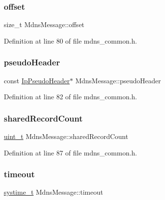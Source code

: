 \subsubsection{\texorpdfstring{offset}{offset}}
{\footnotesize\ttfamily size\+\_\+t Mdns\+Message\+::offset}



Definition at line 80 of file mdns\+\_\+common.\+h.

\mbox{\label{structMdnsMessage_a8173839436f43ca92bf177cf22e4e61f}} 
\subsubsection{\texorpdfstring{pseudo\+Header}{pseudoHeader}}
{\footnotesize\ttfamily const \hyperlink{structIpPseudoHeader}{Ip\+Pseudo\+Header}$\ast$ Mdns\+Message\+::pseudo\+Header}



Definition at line 82 of file mdns\+\_\+common.\+h.

\mbox{\label{structMdnsMessage_a0d87d66898216dc4e73abc9a2189bdde}} 
\subsubsection{\texorpdfstring{shared\+Record\+Count}{sharedRecordCount}}
{\footnotesize\ttfamily \hyperlink{compiler__port_8h_a12a1e9b3ce141648783a82445d02b58d}{uint\+\_\+t} Mdns\+Message\+::shared\+Record\+Count}



Definition at line 87 of file mdns\+\_\+common.\+h.

\mbox{\label{structMdnsMessage_a3590edc47336ebe77d2c35ea4adf49ac}} 
\subsubsection{\texorpdfstring{timeout}{timeout}}
{\footnotesize\ttfamily \hyperlink{compiler__port_8h_ae3e32a98d431a02106616da3071832dd}{systime\+\_\+t} Mdns\+Message\+::timeout}



